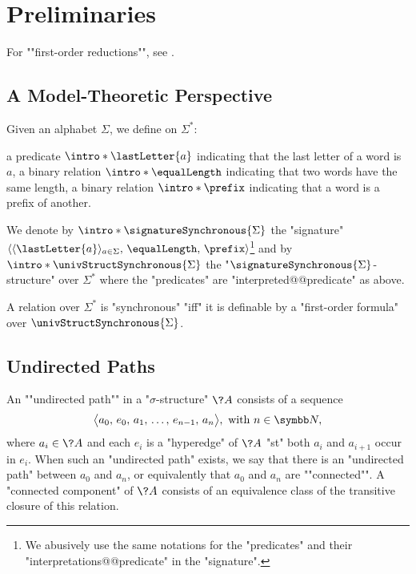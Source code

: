 \section{\AP\label{sec:dichotomy-preliminaries}%
	Preliminaries}

For \AP""first-order reductions"", see
\cite[Definition 2.11 \& Definition 1.26]{Immerman1998DescriptiveComplexity}.

\subsection{A Model-Theoretic Perspective}

Given an alphabet $\Sigma$, we define on $\Sigma^*$:
\begin{itemize}
	\itemAP a predicate $\intro*\lastLetter{a}$ indicating that the last letter of a word is $a$,
	\itemAP a binary relation $\intro*\equalLength$ indicating that two words have the same length,
	\itemAP a binary relation $\intro*\prefix$ indicating that a word is a prefix of another.
\end{itemize} 
We denote by $\intro*\signatureSynchronous{\Sigma}$ the "signature" $\langle \langle\lastLetter{a}\rangle_{a \in \Sigma},\, \equalLength,\, \prefix \rangle$\footnote{We abusively use the same notations for
the "predicates" and their "interpretations@@predicate" in the "signature".} and
by \AP$\intro*\univStructSynchronous{\Sigma}$ the "$\signatureSynchronous{\Sigma}$-structure" over $\Sigma^*$ where
the "predicates" are "interpreted@@predicate" as above.

\begin{proposition}
	\label{prop:synchronous-first-order}
	A relation over $\Sigma^*$ is "synchronous" "iff" it is definable by a "first-order formula" over \(\univStructSynchronous{\Sigma}\).
\end{proposition}

\subsection{Undirected Paths}

An \AP""undirected path"" in a "$\sigma$-structure" $\?A$ consists of a sequence
\[\big\langle a_0,\, e_0,\, a_1,\, \hdots,\, e_{n-1},\, a_n\big\rangle, \text{ with } n \in \N,\]
where $a_i \in \?A$ and each $e_i$ is a "hyperedge" of $\?A$ "st" both
$a_i$ and $a_{i+1}$ occur in $e_i$. When such an "undirected path" exists, we say that
there is an "undirected path" between $a_0$ and $a_n$, or equivalently
that $a_0$ and $a_n$ are \AP""connected"". A \AP"connected component" of $\?A$ consists of an equivalence class of the 
transitive closure of this relation.

